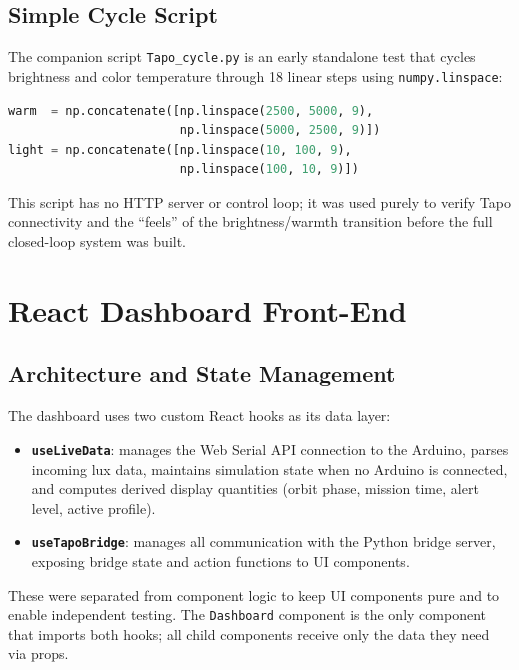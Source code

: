 \documentclass[12pt,letterpaper]{article}
\begin{document}
\subsection{Simple Cycle Script}

The companion script \texttt{Tapo\_cycle.py} is an early standalone test that
cycles brightness and color temperature through 18 linear steps using
\texttt{numpy.linspace}:

\begin{lstlisting}[language=Python, caption={NumPy linspace cycle}]
warm  = np.concatenate([np.linspace(2500, 5000, 9),
                        np.linspace(5000, 2500, 9)])
light = np.concatenate([np.linspace(10, 100, 9),
                        np.linspace(100, 10, 9)])
\end{lstlisting}

This script has no HTTP server or control loop; it was used purely to verify
Tapo connectivity and the ``feels'' of the brightness/warmth transition before
the full closed-loop system was built.

\section{React Dashboard Front-End}

\subsection{Architecture and State Management}

The dashboard uses two custom React hooks as its data layer:

\begin{itemize}
  \item \textbf{\texttt{useLiveData}}: manages the Web Serial API connection
        to the Arduino, parses incoming lux data, maintains simulation state
        when no Arduino is connected, and computes derived display quantities
        (orbit phase, mission time, alert level, active profile).
  \item \textbf{\texttt{useTapoBridge}}: manages all communication with the
        Python bridge server, exposing bridge state and action functions to UI
        components.
\end{itemize}

These were separated from component logic to keep UI components pure and to
enable independent testing. The \texttt{Dashboard} component is the only
component that imports both hooks; all child components receive only the data
they need via props.
\end{document}
